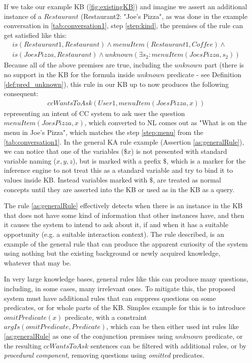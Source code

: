If we take our example KB (\autoref{fig:existingKB}) and imagine we assert
an additional instance of a $Restaurant$ (Restaurant2: "Joe’s Pizza", as was 
done in the example conversation in \autoref{tab:conversation1}, 
step \ref{step:kind}, the premises of the rule can get satisfied like this:
\begin{equation}\label{as:generalRuleantecedent}
\begin{gathered}
is(Restaurant1,Restaurant) \land menuItem(Restaurant1,Coffee)\land \\
	is(JoesPizza,Restaurant) \land unknown(\exists s_2:menuItem(JoesPizza,s_2))
\end{gathered}
\end{equation}
Because all of the above premises are true, including the $unknown$ part
(there is no support in the KB for the formula inside $unknown$ predicate - see 
Definition \autoref{def:pred_unknown}), this rule in our KB up to now produces the 
following consequent:
\begin{equation}\label{as:generalRuleConsequent}
\begin{gathered}
	ccWantsToAsk(User1,menuItem(JoesPizza,x))
\end{gathered}
\end{equation}
representing an intent of CC system to ask user the question 
$menuItem(JoesPizza,x)$, which converted to NL comes out as "What is on the menu
in Joe's Pizza", which matches the step \ref{step:menu} from the 
\autoref{tab:conversation1}. In the general KA rule example (Assertion 
\ref{as:generalRule}), we can notice that one of the variables ($\$x$) is not 
presented with standard variable naming ($x,y,z$), but is marked with a prefix 
$\$$, which is a marker for the inference engine to not treat this as a standard
variable and try to bind it to values inside KB. Instead variables marked with
$\$$, are treated as normal concepts until they are asserted into the KB or used
as in the KB as a query. 

The rule \ref{as:generalRule} effectively detects when there is an instance in 
the KB that does not have some kind of information that other instances have, and
then it causes the system to intend to ask about it, if and when it has a 
suitable opportunity (e.g. a suitable interaction context). The rule described,
is an example of the general rule that can produce the apparent curiosity of 
the system using nothing but the existing background or newly acquired 
knowledge, whatever that may be.

In very large knowledge bases, general rules like this can produce many 
questions, including, in some cases, many irrelevant ones. To mitigate this, the
proposed system must have additional rules that can suppress questions on some 
predicates, or for whole parts of the KB. Simples example for this is to 
introduce $omitPredicate(x)$ predicate, with a constraint 
$argIs(omitPredicate,Predicate)$, which can be then either used int rules like
\ref{as:generalRule} as one of the conjunction premises using $unknown$
predicate, or the resulting $ccWantsToAsk$ sentences can be filtered with
additional rules, or by \emph{procedural component}, removing questions
using \emph{omitted} predicates.

